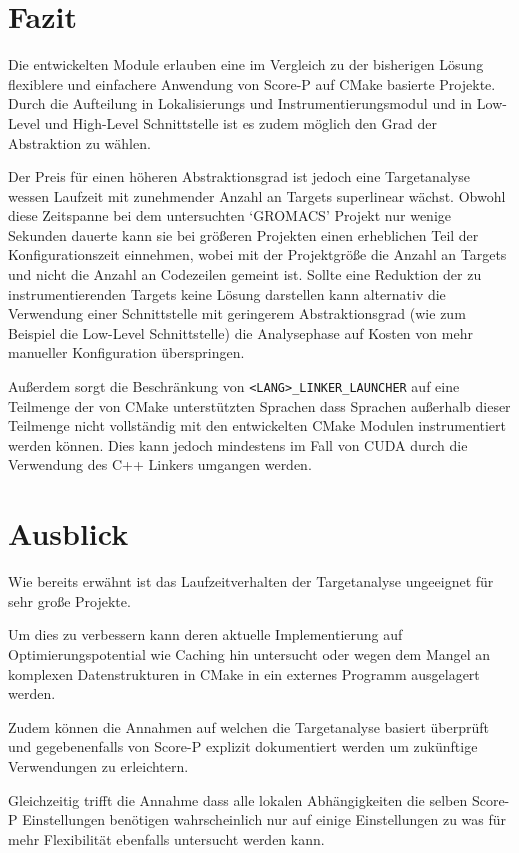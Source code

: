 \documentclass[german,proseminar,hyperref,utf8,lof]{zihpub}
\begin{document}
    \newpage
    \section{Fazit}
    Die entwickelten Module erlauben eine im Vergleich zu der bisherigen Lösung flexiblere und einfachere
    Anwendung von Score-P auf CMake basierte Projekte.
    Durch die Aufteilung in Lokalisierungs und Instrumentierungsmodul und in Low-Level und High-Level
    Schnittstelle ist es zudem möglich den Grad der Abstraktion zu wählen.

    Der Preis für einen höheren Abstraktionsgrad ist jedoch eine Targetanalyse wessen Laufzeit
    mit zunehmender Anzahl an Targets superlinear wächst.
    Obwohl diese Zeitspanne bei dem untersuchten `GROMACS' Projekt nur wenige Sekunden dauerte
    kann sie bei grö{\ss}eren Projekten einen erheblichen Teil der Konfigurationszeit einnehmen, wobei
    mit der Projektgrö{\ss}e die Anzahl an Targets und nicht die Anzahl an Codezeilen gemeint ist.
    Sollte eine Reduktion der zu instrumentierenden Targets keine Lösung darstellen kann alternativ
    die Verwendung einer Schnittstelle mit geringerem Abstraktionsgrad (wie zum Beispiel die Low-Level
    Schnittstelle) die Analysephase auf Kosten von mehr manueller Konfiguration überspringen.

    Au{\ss}erdem sorgt die Beschränkung von \texttt{<LANG>\_LINKER\_LAUNCHER} auf eine Teilmenge
    der von CMake unterstützten Sprachen dass Sprachen au{\ss}erhalb dieser Teilmenge nicht vollständig
    mit den entwickelten CMake Modulen instrumentiert werden können.
    Dies kann jedoch mindestens im Fall von CUDA durch die Verwendung des C++ Linkers umgangen werden.


    \section{Ausblick}
    Wie bereits erwähnt ist das Laufzeitverhalten der Targetanalyse ungeeignet für sehr gro{\ss}e Projekte.

    Um dies zu verbessern kann deren aktuelle Implementierung auf Optimierungspotential wie Caching
    hin untersucht oder wegen dem Mangel an komplexen Datenstrukturen in CMake in ein externes
    Programm ausgelagert werden.

    Zudem können die Annahmen auf welchen die Targetanalyse basiert überprüft und gegebenenfalls von
    Score-P explizit dokumentiert werden um zukünftige Verwendungen zu erleichtern.
    
    Gleichzeitig trifft die Annahme dass alle lokalen Abhängigkeiten die selben Score-P Einstellungen
    benötigen wahrscheinlich nur auf einige Einstellungen zu was für mehr Flexibilität ebenfalls
    untersucht werden kann.
\end{document}
